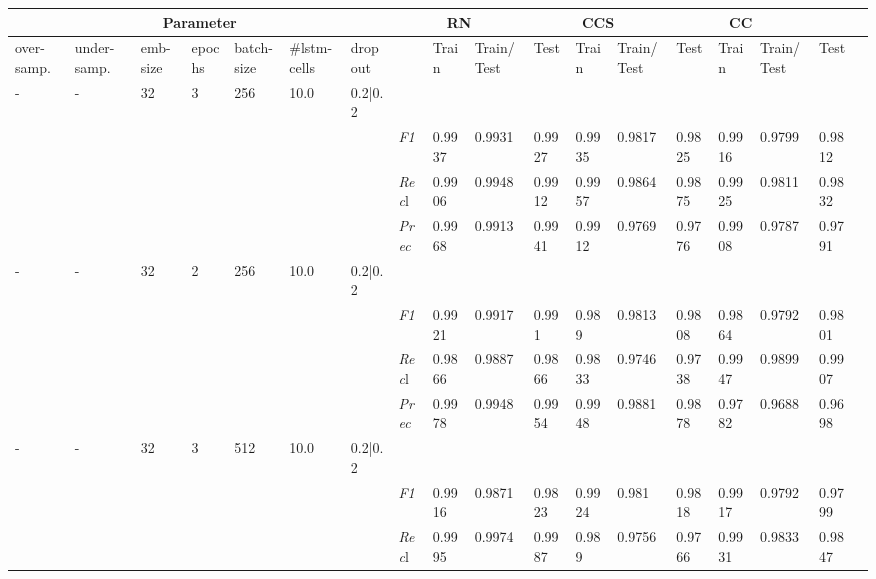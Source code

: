 \begin{table}[]
\tiny
\tabcolsep=0.11cm
\begin{tabularx}{\textwidth}{XXXXXXX|X|XXX|XXX|XXXX}
\toprule
\multicolumn{7}{c}{Parameter} & \multicolumn{3}{c}{RN} & \multicolumn{3}{c}{CCS} & \multicolumn{3}{c}{CC} \\ \midrule
over-\newline samp. & under-\newline samp. & emb-\newline size & epochs &batch-\newline size & \#lstm-\newline cells & dropout & & Train & Train/\newline Test & Test & Train & Train/\newline Test & Test & Train & Train/\newline Test & Test \\ \midrule
- & - & 32 & 3 & 256 &10.0 & 0.2|0.2 & & & & & & & & & \\
& & & & & & & \textit{F1} & 0.9937 & 0.9931 & 0.9927 & 0.9935 & 0.9817        & 0.9825        & 0.9916        & 0.9799        & 0.9812        \\
& & & & & & & \textit{Rec}l & 0.9906 & 0.9948 & 0.9912    & 0.9957 & 0.9864    & 0.9875    & 0.9925    & 0.9811    & 0.9832    \\
& & & & & & & \textit{Prec} & 0.9968 & 0.9913 & 0.9941 & 0.9912 & 0.9769 & 0.9776 & 0.9908 & 0.9787 & 0.9791 \\ \midrule
- & - & 32 & 2 & 256 &10.0 & 0.2|0.2 & & & & & & & & & \\
& & & & & & & \textit{F1} & 0.9921 & 0.9917 & 0.991 & 0.989 & 0.9813        & 0.9808        & 0.9864        & 0.9792        & 0.9801        \\
& & & & & & & \textit{Rec}l & 0.9866 & 0.9887 & 0.9866    & 0.9833 & 0.9746    & 0.9738    & 0.9947    & 0.9899    & 0.9907    \\
& & & & & & & \textit{Prec} & 0.9978 & 0.9948 & 0.9954 & 0.9948 & 0.9881 & 0.9878 & 0.9782 & 0.9688 & 0.9698 \\ \midrule
- & - & 32 & 3 & 512 &10.0 & 0.2|0.2 & & & & & & & & & \\
& & & & & & & \textit{F1} & 0.9916 & 0.9871 & 0.9823 & 0.9924 & 0.981        & 0.9818        & 0.9917        & 0.9792        & 0.9799        \\
& & & & & & & \textit{Rec}l & 0.9995 & 0.9974 & 0.9987    & 0.989 & 0.9756    & 0.9766    & 0.9931    & 0.9833    & 0.9847    \\

\end{tabularx}
\end{table}
